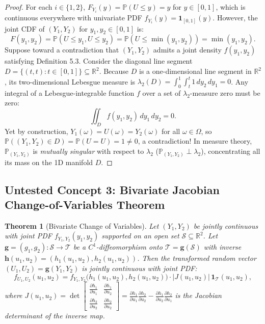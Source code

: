 \documentclass[11pt, letterpaper]{article}
\newtheorem{theorem}{Theorem}[section]
\theoremstyle{definition}
\theoremstyle{remark}
\begin{document}
\begin{proof}
For each $i \in \{1, 2\}$, $F_{Y_i}(y) = \mathbb{P}(U \le y) = y$ for $y \in [0, 1]$, which is continuous everywhere with univariate PDF $f_{Y_i}(y) = \mathbf{1}_{[0, 1]}(y)$. However, the joint CDF of $(Y_1, Y_2)$ for $y_1, y_2 \in [0, 1]$ is:
\[
    F(y_1, y_2) = \mathbb{P}(U \le y_1, U \le y_2) = \mathbb{P}(U \le \min(y_1, y_2)) = \min(y_1, y_2).
\]
Suppose toward a contradiction that $(Y_1, Y_2)$ admits a joint density $f(y_1, y_2)$ satisfying Definition 5.3. Consider the diagonal line segment $D = \{(t, t) : t \in [0, 1]\} \subseteq \mathbb{R}^2$. Because $D$ is a one-dimensional line segment in $\mathbb{R}^2$, its two-dimensional Lebesgue measure is $\lambda_2(D) = \int_0^1 \int_t^t 1\,dy_2\,dy_1 = 0$. Any integral of a Lebesgue-integrable function $f$ over a set of $\lambda_2$-measure zero must be zero:
\[
    \iint_{D} f(y_1, y_2)\,dy_1\,dy_2 = 0.
\]
Yet by construction, $Y_1(\omega) = U(\omega) = Y_2(\omega)$ for all $\omega \in \Omega$, so $\mathbb{P}((Y_1, Y_2) \in D) = \mathbb{P}(U = U) = 1 \neq 0$, a contradiction! In measure theory, $\mathbb{P}_{(Y_1, Y_2)}$ is \emph{mutually singular} with respect to $\lambda_2$ ($\mathbb{P}_{(Y_1, Y_2)} \perp \lambda_2$), concentrating all its mass on the 1D manifold $D$.
\end{proof}

\subsection{Untested Concept 3: Bivariate Jacobian Change-of-Variables Theorem}

\begin{theorem}[Bivariate Change of Variables]
Let $(Y_1, Y_2)$ be jointly continuous with joint PDF $f_{Y_1, Y_2}(y_1, y_2)$ supported on an open set $\mathcal{S} \subseteq \mathbb{R}^2$. Let $\mathbf{g} = (g_1, g_2) : \mathcal{S} \to \mathcal{T}$ be a $C^1$-diffeomorphism onto $\mathcal{T} = \mathbf{g}(\mathcal{S})$ with inverse $\mathbf{h}(u_1, u_2) = (h_1(u_1, u_2), h_2(u_1, u_2))$. Then the transformed random vector $(U_1, U_2) = \mathbf{g}(Y_1, Y_2)$ is jointly continuous with joint PDF:
\[
    f_{U_1, U_2}(u_1, u_2) = f_{Y_1, Y_2}\bigl(h_1(u_1, u_2), h_2(u_1, u_2)\bigr) \cdot \bigl| J(u_1, u_2) \bigr| \, \mathbf{1}_{\mathcal{T}}(u_1, u_2),
\]
where $J(u_1, u_2) = \det \begin{bmatrix} \frac{\partial h_1}{\partial u_1} & \frac{\partial h_1}{\partial u_2} \\[4pt] \frac{\partial h_2}{\partial u_2} & \frac{\partial h_2}{\partial u_2} \end{bmatrix} = \frac{\partial h_1}{\partial u_1}\frac{\partial h_2}{\partial u_2} - \frac{\partial h_1}{\partial u_2}\frac{\partial h_2}{\partial u_1}$ is the Jacobian determinant of the inverse map.
\end{theorem}
\end{document}
